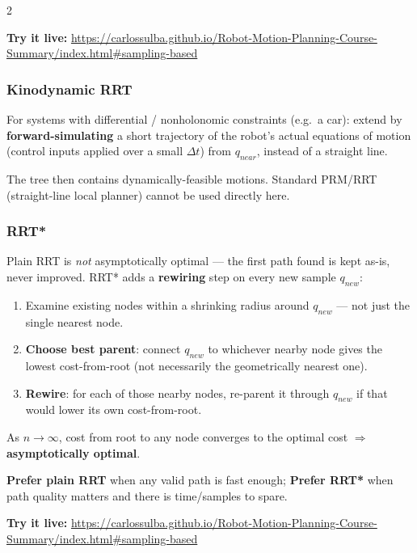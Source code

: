 \documentclass[10pt,a4paper]{article}
\newcommand{\keyterm}[1]{\textbf{#1}}
\newcommand{\demo}[1]{\textbf{Try it live:} \url{#1}}
\begin{document}
\begin{multicols}{2}
\begin{democallout}
\demo{https://carlossulba.github.io/Robot-Motion-Planning-Course-Summary/index.html\#sampling-based}
\end{democallout}

\subsubsection{Kinodynamic RRT}
For systems with differential / nonholonomic constraints (e.g.\ a car): extend by \keyterm{forward-simulating} a short trajectory of the robot's actual equations of motion (control inputs applied over a small $\Delta t$) from $q_{near}$, instead of a straight line.

The tree then contains dynamically-feasible motions. Standard PRM/RRT (straight-line local planner) cannot be used directly here.

\subsubsection{RRT*}
Plain RRT is \emph{not} asymptotically optimal — the first path found is kept as-is, never improved. RRT* adds a \keyterm{rewiring} step on every new sample $q_{new}$:
\begin{enumerate}
\item Examine existing nodes within a shrinking radius around $q_{new}$ — not just the single nearest node.
\item \keyterm{Choose best parent}: connect $q_{new}$ to whichever nearby node gives the lowest cost-from-root (not necessarily the geometrically nearest one).
\item \keyterm{Rewire}: for each of those nearby nodes, re-parent it through $q_{new}$ if that would lower its own cost-from-root.
\end{enumerate}
As $n\to\infty$, cost from root to any node converges to the optimal cost $\Rightarrow$ \keyterm{asymptotically optimal}.

\keyterm{Prefer plain RRT} when any valid path is fast enough; \keyterm{Prefer RRT*} when path quality matters and there is time/samples to spare.
\begin{democallout}
\demo{https://carlossulba.github.io/Robot-Motion-Planning-Course-Summary/index.html\#sampling-based}
\end{democallout}


\end{multicols}
\end{document}
